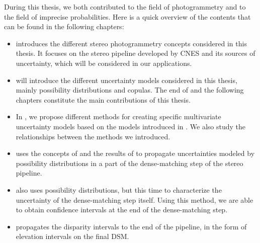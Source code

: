 During this thesis, we both contributed to the field of photogrammetry and to the field of imprecise probabilities. Here is a quick overview of the contents that can be found in the following chapters:
\begin{itemize}
    \item {} introduces the different stereo photogrammetry concepts considered in this thesis. It focuses on the stereo pipeline developed by CNES and its sources of uncertainty, which will be considered in our applications.
    \item {} will introduce the different uncertainty models considered in this thesis, mainly possibility distributions and copulas. The end of  and the following chapters constitute the main contributions of this thesis.
    \item In , we propose different methods for creating specific multivariate uncertainty models based on the models introduced in . We also study the relationships between the methods we introduced.
    \item {} uses the concepts of  and the results of  to propagate uncertainties modeled by possibility distributions in a part of the dense-matching step of the stereo pipeline.
    \item {} also uses possibility distributions, but this time to characterize the uncertainty of the dense-matching step itself. Using this method, we are able to obtain confidence intervals at the end of the dense-matching step. 
    \item {} propagates the disparity intervals to the end of the pipeline, in the form of elevation intervals on the final DSM. 
\end{itemize}

